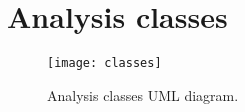 \chapter{Analysis classes}\label{ch:classes}

\begin{figure}[ht]
	\texttt{[image: classes]}
	\caption{Analysis classes UML diagram.}
	\label{fig:classes}
\end{figure}
